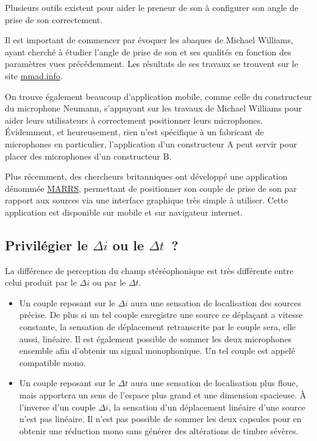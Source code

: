 \documentclass[
]{book}
\providecommand{\tightlist}{%
  \setlength{\itemsep}{0pt}\setlength{\parskip}{0pt}}
\begin{document}
Plusieurs outils existent pour aider le preneur de son à configurer son angle de prise de son correctement.

Il est important de commencer par évoquer les abaques de Michael Williams, ayant cherché à étudier l'angle de prise de son et ses qualités en fonction des paramètres vues précédemment. Les résultats de ses travaux se trouvent sur le site \href{https://www.mmad.info/MAD/2\%20Ch/2ch.htm}{mmad.info}.

On trouve également beaucoup d'application mobile, comme celle du constructeur du microphone Neumann, s'appuyant sur les travaux de Michael Williams pour aider leurs utilisateurs à correctement positionner leurs microphones. Évidemment, et heureusement, rien n'est spécifique à un fabricant de microphones en particulier, l'application d'un constructeur A peut servir pour placer des microphones d'un constructeur B.

Plus récemment, des chercheurs britanniques ont développé une application dénommée \href{https://marrsweb.hud.ac.uk/}{MARRS}, permettant de positionner son couple de prise de son par rapport aux sources via une interface graphique très simple à utiliser. Cette application est disponible sur mobile et sur navigateur internet.

\hypertarget{priviluxe9gier-le-delta-i-ou-le-delta-t}{%
\subsection{\texorpdfstring{Privilégier le \(\Delta i\) ou le \(\Delta t\)~?}{Privilégier le \textbackslash Delta i ou le \textbackslash Delta t~?}}\label{priviluxe9gier-le-delta-i-ou-le-delta-t}}

La différence de perception du champ stéréophonique est très différente entre celui produit par le \(\Delta i\) ou par le \(\Delta t\).

\begin{itemize}
\tightlist
\item
  Un couple reposant sur le \(\Delta i\) aura une sensation de localisation des sources précise. De plus si un tel couple enregistre une source ce déplaçant a vitesse constante, la sensation de déplacement retranscrite par le couple sera, elle aussi, linéaire. Il est également possible de sommer les deux microphones ensemble afin d'obtenir un signal monophonique. Un tel couple est appelé compatible mono.
\item
  Un couple reposant sur le \(\Delta t\) aura une sensation de localisation plus floue, mais apportera un sens de l'espace plus grand et une dimension spacieuse. À l'inverse d'un couple \(\Delta i\), la sensation d'un déplacement linéaire d'une source n'est pas linéaire. Il n'est pas possible de sommer les deux capsules pour en obtenir une réduction mono sans générer des altérations de timbre sévères.
\end{itemize}
\end{document}
